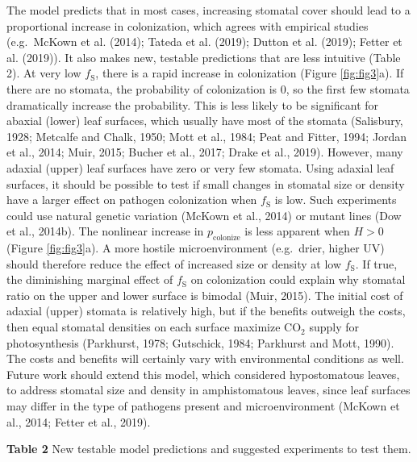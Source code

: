 \documentclass[utf8]{frontiersSCNS}
\newcommand{\fs}{$f_\text{S}$}
\begin{document}
The model predicts that in most cases, increasing stomatal cover should
lead to a proportional increase in colonization, which agrees with
empirical studies (e.g.~McKown et al. (2014); Tateda et al. (2019);
Dutton et al. (2019); Fetter et al. (2019)). It also makes new, testable
predictions that are less intuitive (Table 2). At very low \fs, there is
a rapid increase in colonization (Figure \ref{fig:fig3}a). If there are
no stomata, the probability of colonization is 0, so the first few
stomata dramatically increase the probability. This is less likely to be
significant for abaxial (lower) leaf surfaces, which usually have most
of the stomata (Salisbury, 1928; Metcalfe and Chalk, 1950; Mott et al.,
1984; Peat and Fitter, 1994; Jordan et al., 2014; Muir, 2015; Bucher et
al., 2017; Drake et al., 2019). However, many adaxial (upper) leaf
surfaces have zero or very few stomata. Using adaxial leaf surfaces, it
should be possible to test if small changes in stomatal size or density
have a larger effect on pathogen colonization when \fs{} is low. Such
experiments could use natural genetic variation (McKown et al., 2014) or
mutant lines (Dow et al., 2014b). The nonlinear increase in
\(p_\text{colonize}\) is less apparent when \(H > 0\) (Figure
\ref{fig:fig3}a). A more hostile microenvironment (e.g.~drier, higher
UV) should therefore reduce the effect of increased size or density at
low \fs. If true, the diminishing marginal effect of \fs{} on
colonization could explain why stomatal ratio on the upper and lower
surface is bimodal (Muir, 2015). The initial cost of adaxial (upper)
stomata is relatively high, but if the benefits outweigh the costs, then
equal stomatal densities on each surface maximize CO\(_2\) supply for
photosynthesis (Parkhurst, 1978; Gutschick, 1984; Parkhurst and Mott,
1990). The costs and benefits will certainly vary with environmental
conditions as well. Future work should extend this model, which
considered hypostomatous leaves, to address stomatal size and density in
amphistomatous leaves, since leaf surfaces may differ in the type of
pathogens present and microenvironment (McKown et al., 2014; Fetter et
al., 2019).

\textbf{Table 2} \textbar{} New testable model predictions and suggested
experiments to test them.
\end{document}
